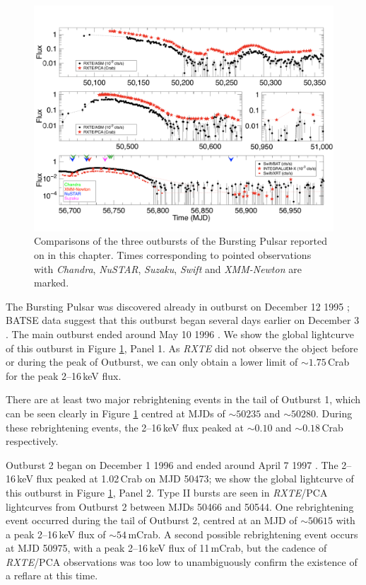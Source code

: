 \begin{figure}
  \centering
  \includegraphics[width=.9\linewidth, trim={0cm 0 0cm 0},clip]{images/lc_comp.pdf}
  \caption[Comparisons of three outbursts of the Bursting Pulsar.]{\small Comparisons of the three outbursts of the Bursting Pulsar reported on in this chapter.  Times corresponding to pointed observations with \textit{Chandra}, \textit{NuSTAR}, \textit{Suzaku}, \textit{Swift} and \textit{XMM-Newton} are marked.}
  \label{fig:global_ob}
\end{figure}

\par The Bursting Pulsar was discovered already in outburst on December 12 1995 \citep{Fishman_Discovery}; BATSE data suggest that this outburst began several days earlier on December 3 \citep{Paciesas_BPDiscovery,Bildsten_Rev}.  The main outburst ended around May 10 1996 \citep{Woods_PulseBursts}.  We show the global lightcurve of this outburst in Figure \ref{fig:global_ob}, Panel 1.  As \textit{RXTE} did not observe the object before or during the peak of Outburst, we can only obtain a lower limit of $\sim1.75$\,Crab for the peak 2--16\,keV flux.
\par There are at least two major rebrightening events in the tail of Outburst 1, which can be seen clearly  in Figure \ref{fig:global_ob} centred at MJDs of $\sim50235$ and $\sim50280$.  During these rebrightening events, the 2--16\,keV flux peaked at $\sim0.10$ and $\sim0.18$\,Crab respectively.

\par Outburst 2 began on December 1 1996 and ended around April 7 1997 \citep{Woods_OB2}.  The 2--16\,keV flux peaked at 1.02\,Crab on MJD 50473; we show the global lightcurve of this outburst in Figure \ref{fig:global_ob}, Panel 2.  Type II bursts are seen in \textit{RXTE}/PCA lightcurves from Outburst 2 between MJDs 50466 and 50544.  One rebrightening event occurred during the tail of Outburst 2, centred at an MJD of $\sim50615$ with a peak 2--16\,keV flux of $\sim54$\,mCrab.  A second possible rebrightening event occurs at MJD 50975, with a peak 2--16\,keV flux of 11\,mCrab, but the cadence of \textit{RXTE}/PCA observations was too low to unambiguously confirm the existence of a reflare at this time.


